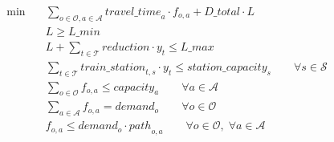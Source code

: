 \begin{align}
  \min\quad & \sum_{o \in \mathcal{O}, a \in \mathcal{A}} \mathit{travel\_time}_{a} \cdot f_{o,a} + \mathit{D\_total} \cdot L \tag{total\_delay} \\
  & L \ge \mathit{L\_min} \tag{len\_lower} \\
  & L + \sum_{t \in \mathcal{T}} \mathit{reduction} \cdot y_{t} \le \mathit{L\_max} \tag{len\_upper} \\
  & \sum_{t \in \mathcal{T}} \mathit{train\_station}_{t,s} \cdot y_{t} \le \mathit{station\_capacity}_{s} \qquad \forall s \in \mathcal{S} \tag{station\_capacity\_con} \\
  & \sum_{o \in \mathcal{O}} f_{o,a} \le \mathit{capacity}_{a} \qquad \forall a \in \mathcal{A} \tag{arc\_capacity} \\
  & \sum_{a \in \mathcal{A}} f_{o,a} = \mathit{demand}_{o} \qquad \forall o \in \mathcal{O} \tag{demand\_satisfaction} \\
  & f_{o,a} \le \mathit{demand}_{o} \cdot \mathit{path}_{o,a} \qquad \forall o \in \mathcal{O},\; \forall a \in \mathcal{A} \tag{path\_feasibility} \\
\end{align}